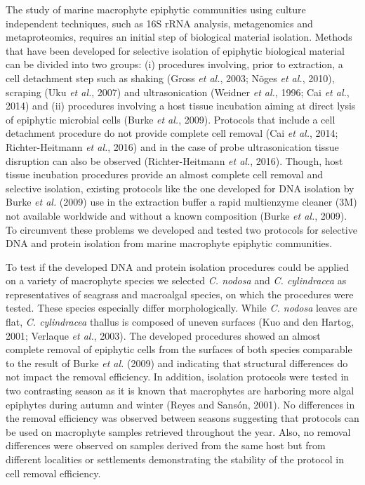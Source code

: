 \documentclass[
  12pt,
]{article}
\begin{document}
The study of marine macrophyte epiphytic communities using culture
independent techniques, such as 16S rRNA analysis, metagenomics and
metaproteomics, requires an initial step of biological material
isolation. Methods that have been developed for selective isolation of
epiphytic biological material can be divided into two groups: (i)
procedures involving, prior to extraction, a cell detachment step such
as shaking (Gross \emph{et al.}, 2003; Nõges \emph{et al.}, 2010),
scraping (Uku \emph{et al.}, 2007) and ultrasonication (Weidner \emph{et
al.}, 1996; Cai \emph{et al.}, 2014) and (ii) procedures involving a
host tissue incubation aiming at direct lysis of epiphytic microbial
cells (Burke \emph{et al.}, 2009). Protocols that include a cell
detachment procedure do not provide complete cell removal (Cai \emph{et
al.}, 2014; Richter-Heitmann \emph{et al.}, 2016) and in the case of
probe ultrasonication tissue disruption can also be observed
(Richter-Heitmann \emph{et al.}, 2016). Though, host tissue incubation
procedures provide an almost complete cell removal and selective
isolation, existing protocols like the one developed for DNA isolation
by Burke \emph{et al.} (2009) use in the extraction buffer a rapid
multienzyme cleaner (3M) not available worldwide and without a known
composition (Burke \emph{et al.}, 2009). To circumvent these problems we
developed and tested two protocols for selective DNA and protein
isolation from marine macrophyte epiphytic communities.

To test if the developed DNA and protein isolation procedures could be
applied on a variety of macrophyte species we selected \emph{C. nodosa}
and \emph{C. cylindracea} as representatives of seagrass and macroalgal
species, on which the procedures were tested. These species especially
differ morphologically. While \emph{C. nodosa} leaves are flat, \emph{C.
cylindracea} thallus is composed of uneven surfaces (Kuo and den Hartog,
2001; Verlaque \emph{et al.}, 2003). The developed procedures showed an
almost complete removal of epiphytic cells from the surfaces of both
species comparable to the result of Burke \emph{et al.} (2009) and
indicating that structural differences do not impact the removal
efficiency. In addition, isolation protocols were tested in two
contrasting season as it is known that macrophytes are harboring more
algal epiphytes during autumn and winter (Reyes and Sansón, 2001). No
differences in the removal efficiency was observed between seasons
suggesting that protocols can be used on macrophyte samples retrieved
throughout the year. Also, no removal differences were observed on
samples derived from the same host but from different localities or
settlements demonstrating the stability of the protocol in cell removal
efficiency.
\end{document}
